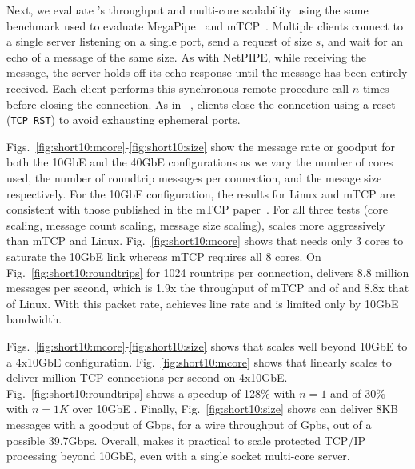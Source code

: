 Next, we evaluate \ix's throughput and multi-core scalability using
the same benchmark used to evaluate
MegaPipe~\cite{DBLP:conf/osdi/HanMCR12} and
mTCP~\cite{jeong2014mtcp}. Multiple clients connect to a single server
listening on a single port, send a request of size $s$, and wait for
an echo of a message of the same size.  As with NetPIPE, while
receiving the message, the server holds off its echo response until
the message has been entirely received.  Each client performs this
synchronous remote procedure call $n$ times before closing the
connection.  As in ~\cite{jeong2014mtcp}, clients close the connection
using a reset (\texttt{TCP RST}) to avoid exhausting ephemeral ports.



Figs.~\ref{fig:short10:mcore}-\ref{fig:short10:size} show the message
rate or goodput for both the 10GbE and the 40GbE configurations as we
vary the number of cores used, the number of roundtrip messages per
connection, and the mesage size respectively.  For the 10GbE
configuration, the results for Linux and mTCP are consistent with
those published in the mTCP paper~\cite{jeong2014mtcp}.  For all three
tests (core scaling, message count scaling, message size scaling), \ix
scales more aggressively than mTCP and
Linux. Fig.~\ref{fig:short10:mcore} shows that \ix needs only 3 cores
to saturate the 10GbE link whereas mTCP requires all 8 cores. On
Fig.~\ref{fig:short10:roundtrips} for 1024 rountrips per connection,
\ix delivers 8.8 million messages per second, which is
1.9x the throughput of mTCP and of and  8.8x that of
Linux. With this packet rate, \ix achieves line rate and is limited
only by 10GbE bandwidth.


Figs.~\ref{fig:short10:mcore}-\ref{fig:short10:size} shows that \ix
scales well beyond 10GbE to a 4x10GbE configuration.
Fig.~\ref{fig:short10:mcore} shows that \ix linearly scales to deliver
million TCP connections per second on 4x10GbE.
Fig.~\ref{fig:short10:roundtrips} shows a speedup of 128\% with $n=1$
and of 30\% with $n=1K$ over 10GbE \ix.  Finally,
Fig.~\ref{fig:short10:size} shows \ix can deliver 8KB messages with a
goodput of Gbps, for a wire throughput of
Gpbs, out of a possible 39.7Gbps.  Overall, \ix makes
it practical to scale protected TCP/IP processing beyond 10GbE, even
with a single socket multi-core server.

